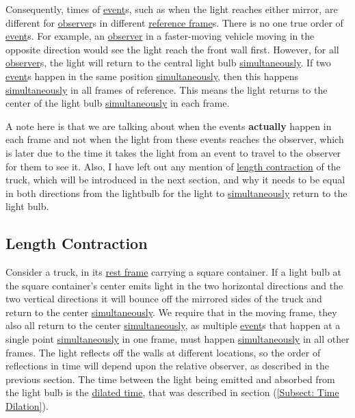 %

Consequently, times of \hyperlink{def-event}{event}s, such as when the light reaches either mirror, are different for \hyperlink{def-observer}{observer}s in different \hyperlink{def-Reference-frame}{reference frame}s.
There is no one true order of \hyperlink{def-event}{event}s.
For example, an \hyperlink{def-observer}{observer} in a faster-moving vehicle moving in the opposite direction would see the light reach the front wall first.
However, for all \hyperlink{def-observer}{observer}s, the light will return to the central light bulb \hyperlink{def-simultaneity}{simultaneously}.
If two \hyperlink{def-event}{event}s happen in the same position \hyperlink{def-simultaneity}{simultaneously}, then this happens \hyperlink{def-simultaneity}{simultaneously} in all frames of reference.
This means the light returns to the center of the light bulb \hyperlink{def-simultaneity}{simultaneously} in each frame.

A note here is that we are talking about when the events \textbf{actually} happen in each frame and not when the light from these events reaches the observer, which is later due to the time it takes the light from an event to travel to the observer for them to see it.
Also, I have left out any mention of \hyperlink{def-length-contraction}{length contraction} of the truck, which will be introduced in the next section, and why it needs to be equal in both directions from the lightbulb for the light to \hyperlink{def-simultaneity}{simultaneously} return to the light bulb.


\subsection{Length Contraction} \label{subsect: Length Contraction}

Consider a truck, in its \hyperlink{def-proper-frame}{rest frame} carrying a square container.
If a light bulb at the square container's center emits light in the two horizontal directions and the two vertical directions it will bounce off the mirrored sides of the truck and return to the center \hyperlink{def-simultaneity}{simultaneously}.
We require that in the moving frame, they also all return to the center \hyperlink{def-simultaneity}{simultaneously}, as multiple \hyperlink{def-event}{event}s that happen at a single point \hyperlink{def-simultaneity}{simultaneously} in one frame, must happen \hyperlink{def-simultaneity}{simultaneously} in all other frames.
The light reflects off the walls at different locations, so the order of reflections in time will depend upon the relative observer, as described in the previous section.
The time between the light being emitted and absorbed from the light bulb is the \hyperlink{def-time-dilation}{dilated time}, that was described in section (\ref{Subsect: Time Dilation}).

